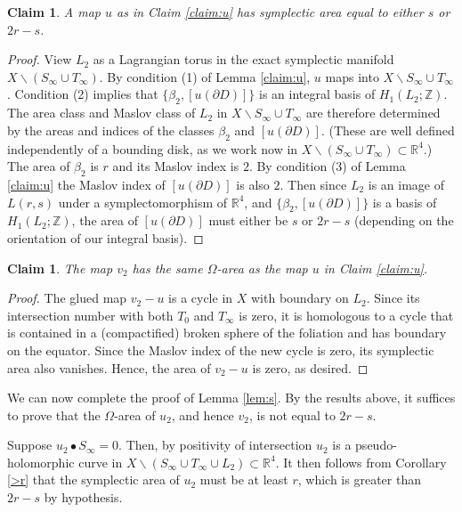 \documentclass[12pt]{amsart}
\newtheorem{claim}[theorem]{Claim}
\theoremstyle{definition}
\newcommand{\RR}{{\mathbb R}}
\newcommand{\ZZ}{{\mathbb Z}}
\begin{document}
\begin{claim}
A map $u$ as in Claim \ref{claim:u} has symplectic area equal to either $s$ or $2r-s$.
\end{claim} 

\begin{proof} View $L_2$ as a Lagrangian torus in the exact symplectic manifold $X \smallsetminus (S_\infty \cup T_{\infty})$.
By condition (1) of Lemma \ref{claim:u}, $u$ maps into $X \smallsetminus S_\infty \cup T_{\infty}$. Condition (2) implies that  $\{ \beta_2, [u(\partial D)]\}$ is an integral basis of $H_1(L_2; \ZZ)$. The area class and Maslov class of $L_2$ in $X \smallsetminus S_\infty \cup T_{\infty}$ are therefore determined by the areas and indices of the classes $\beta_2$ and  $[u(\partial D)]$. 
(These are well defined independently of a bounding disk, as we work now in $X \smallsetminus (S_\infty \cup T_{\infty}) \subset \RR^4$.)
The area of $\beta_2$ is $r$ and its Maslov index is $2$. By condition (3) of Lemma \ref{claim:u} the Maslov index of $[u(\partial D)]$ is also $2$. Then since $L_2$ is an image of $L(r,s)$ under a symplectomorphism of $\RR^4$, and $\{ \beta_2, [u(\partial D)]\}$ is a basis of $H_1(L_2; \ZZ)$, the area of $[u(\partial D)]$ must either be $s$ or $2r-s$ (depending on the orientation of our integral basis).
\end{proof}

\begin{claim}
The map $v_2$ has the same $\Omega$-area as the map $u$ in Claim \ref{claim:u}.
\end{claim} 

\begin{proof}
The glued map $v_2-u$ is a cycle in $X$ with boundary on $L_2$. Since its intersection number with both $T_0$ and $T_\infty$ is zero, it is homologous to a cycle that is contained in a (compactified) broken sphere of the foliation and has boundary on the equator. Since the Maslov index of the new cycle is zero, its symplectic area also vanishes. Hence, the area of $v_2-u$ is zero, as desired.
    
\end{proof}


We can now complete the proof of Lemma \ref{lem:s}. By the results above, it suffices to prove that the $\Omega$-area of $u_2$, and hence $v_2$, is not equal to $2r-s.$


\bigskip


 Suppose $u_2 \bullet S_\infty=0$.  Then, by positivity of intersection $u_2$ is a pseudo-holomorphic curve in $X \smallsetminus (S_\infty \cup T_\infty \cup L_2) \subset \RR^4$. It then follows from Corollary \ref{>r} that the symplectic area of $u_2$ must be at least $r$, which is greater than $2r-s$ by hypothesis.
\end{document}
